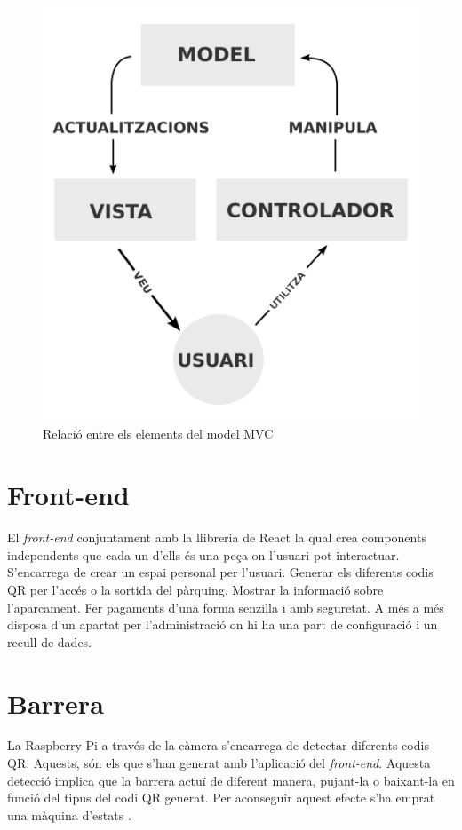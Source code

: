 \begin{figure}[H]
    \begin{center}
        \includegraphics[scale=0.20]{Fotos/arquitectura_mvc.png}
    \end{center}
    \caption{Relació entre els elements del model MVC \autocite{mvc}}
    \label{fig:compiler_phases}
\end{figure}

\section{Front-end}

El \emph{front-end} conjuntament amb la llibreria de React la qual crea components independents
que cada un d'ells és una peça on l'usuari pot interactuar. S'encarrega de crear un espai personal
per l'usuari. Generar els diferents codis QR per l'accés o la sortida del pàrquing.
Mostrar la informació sobre l'aparcament. Fer pagaments d'una forma senzilla i amb seguretat.
A més a més disposa d'un apartat per l'administració on hi ha una part de configuració i un recull de dades.

\section{Barrera}

La Raspberry Pi a través de la càmera s'encarrega de detectar diferents codis QR. Aquests, són els
que s'han generat amb l'aplicació del \emph{front-end}. Aquesta detecció implica que la barrera
actuï de diferent manera, pujant-la o baixant-la en funció del tipus del codi QR generat.
Per aconseguir aquest efecte s'ha emprat una màquina d'estats \autocite{maq_estats}.